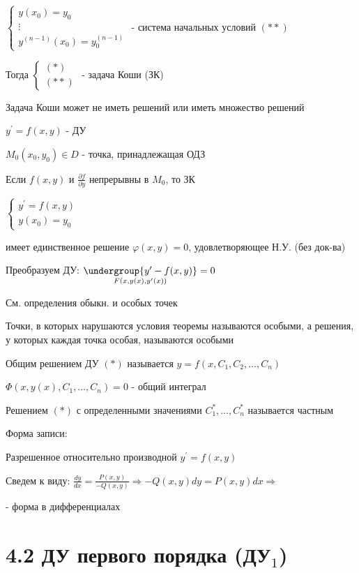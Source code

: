 \documentclass[12pt]{article}
\begin{document}
     $\begin{cases}y(x_0) = y_0 \\ \vdots \\ y^{(n - 1)}(x_0) = y_0^{(n - 1)}\end{cases}$ - система начальных условий $(**)$

    Тогда $\begin{cases}(*) \\ (**)\end{cases}$ - задача Коши (ЗК)

    \Nota Задача Коши может не иметь решений или иметь множество решений

    \Th $y^\prime = f(x, y)$ - ДУ

    $M_0(x_0, y_0) \in D$ - точка, принадлежащая ОДЗ

    Если $f(x, y)$ и $\frac{\partial f}{\partial y}$ непрерывны в $M_0$, то ЗК

    $\begin{cases}y^\prime = f(x, y) \\ y(x_0) = y_0\end{cases}$

    имеет единственное решение $\varphi(x, y) = 0$, удовлетворяющее Н.У. (без док-ва)

    \Nota Преобразуем ДУ: $\underset{F(x, y(x), y^\prime(x))}{\undergroup{y^\prime - f(x, y)}} = 0$

    См. определения обыкн. и особых точек

     Точки, в которых нарушаются условия теоремы называются особыми, а решения, у которых каждая точка особая,
    называются особыми

     Общим решением ДУ $(*)$ называется $y = f(x, C_1, C_2, \dots, C_n)$

    \Nota $\Phi(x, y(x), C_1, \dots, C_n) = 0$ - общий интеграл

     Решением $(*)$ с определенными значениями $C_1^*, \dots, C_n^*$ называется частным

    \Nota Форма записи:

    Разрешенное относительно производной $y^\prime = f(x, y)$

    Сведем к виду: $\frac{dy}{dx} = \frac{P(x, y)}{-Q(x, y)} \Longrightarrow -Q(x, y)dy = P(x, y)dx \Longrightarrow $

     - форма в дифференциалах



    \section{4.2 ДУ первого порядка (ДУ$_1$)}
\end{document}
